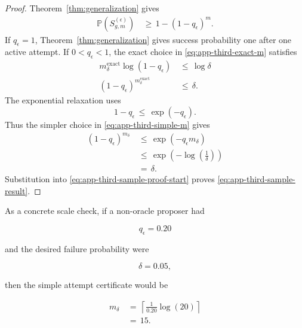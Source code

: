 \documentclass{article} %
\begin{document}
\begin{proof}
Theorem~\ref{thm:generalization} gives
\begin{align}
\label{eq:app-third-sample-proof-start}
\mathbb{P}\!\left(
S_{g,m}^{(\epsilon)}
\right)
&\,\ge\,
1-(1-q_{\epsilon})^{m}.
\end{align}
If $q_\epsilon=1$, Theorem~\ref{thm:generalization} gives success probability
one after one active attempt. If $0<q_\epsilon<1$, the exact choice in
\eqref{eq:app-third-exact-m} satisfies
\begin{align}
\label{eq:app-third-sample-proof-exact}
m_{\delta}^{\mathrm{exact}}
\log(1-q_{\epsilon})
&\,\le\,
\log \delta
\\
(1-q_{\epsilon})^{m_{\delta}^{\mathrm{exact}}}
&\,\le\,
\delta.
\end{align}
The exponential relaxation uses
\begin{equation}
\label{eq:app-third-log-relax}
1-q_{\epsilon}
\,\le\,
\exp(-q_{\epsilon}).
\end{equation}
Thus the simpler choice in \eqref{eq:app-third-simple-m} gives
\begin{align}
\label{eq:app-third-sample-proof-simple}
(1-q_{\epsilon})^{m_{\delta}}
&\,\le\,
\exp(-q_{\epsilon}m_{\delta})
\\
&\,\le\,
\exp\!\left(
-\log\!\left(\frac{1}{\delta}\right)
\right)
\\
&\,=\,
\delta.
\end{align}
Substitution into \eqref{eq:app-third-sample-proof-start} proves \eqref{eq:app-third-sample-result}.
\end{proof}

As a concrete scale check, if a non-oracle proposer had

\begin{equation}
\label{eq:app-third-example-q}
q_{\epsilon}
=
0.20
\end{equation}

and the desired failure probability were

\begin{equation}
\label{eq:app-third-example-delta}
\delta
=
0.05,
\end{equation}

then the simple attempt certificate would be

\begin{align}
\label{eq:app-third-example-m}
m_{\delta}
&\,=\,
\left\lceil
\frac{1}{0.20}\log(20)
\right\rceil
\\
&\,=\,
15.
\end{align}
\end{document}
